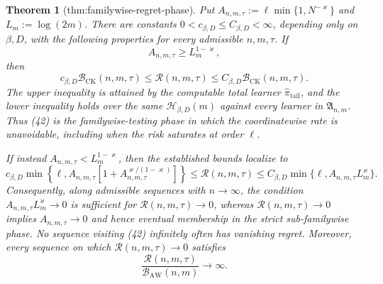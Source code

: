 \documentclass{article}
\newtheorem{theorem}{Theorem}
\begin{document}
\begin{theorem}[thm:familywise-regret-phase]\label{thm:familywise-regret-phase}
Put \(A_{n,m,\tau}:=\ell\min\{1,N^{-\varkappa}\}\) and \(L_m:=\log(2m)\). There are constants \(0<c_{\beta,D}\leq C_{\beta,D}<\infty\), depending only on \(\beta,D\), with the following properties for every admissible \(n,m,\tau\). If
\[
A_{n,m,\tau}\geq L_m^{1-\varkappa},                                       \tag{42}
\]
then
\[
c_{\beta,D}\mathcal B_{\mathrm{CK}}(n,m,\tau)
\leq \mathcal R(n,m,\tau)
\leq C_{\beta,D}\mathcal B_{\mathrm{CK}}(n,m,\tau).                       \tag{43}
\]
The upper inequality is attained by the computable total learner \(\widehat\pi_{\mathrm{tail}}\), and the lower inequality holds over the same \(\mathcal H_{\beta,D}(m)\) against every learner in \(\mathfrak A_{n,m}\). Thus (42) is the familywise-testing phase in which the coordinatewise rate is unavoidable, including when the risk saturates at order \(\ell\).

If instead \(A_{n,m,\tau}<L_m^{1-\varkappa}\), then the established bounds localize to
\[
c_{\beta,D}\min\!\left\{\ell,
A_{n,m,\tau}\left[1+A_{n,m,\tau}^{\varkappa/(1-\varkappa)}\right]\right\}
\leq \mathcal R(n,m,\tau)
\leq C_{\beta,D}\min\{\ell,A_{n,m,\tau}L_m^{\varkappa}\}.               \tag{44}
\]
Consequently, along admissible sequences with \(n\to\infty\), the condition \(A_{n,m,\tau}L_m^{\varkappa}\to0\) is sufficient for \(\mathcal R(n,m,\tau)\to0\), whereas \(\mathcal R(n,m,\tau)\to0\) implies \(A_{n,m,\tau}\to0\) and hence eventual membership in the strict sub-familywise phase. No sequence visiting (42) infinitely often has vanishing regret. Moreover, every sequence on which \(\mathcal R(n,m,\tau)\to0\) satisfies
\[
\frac{\mathcal R(n,m,\tau)}{\mathcal B_{\mathrm{AW}}(n,m)}\longrightarrow\infty. \tag{45}
\]
\end{theorem}
\end{document}
